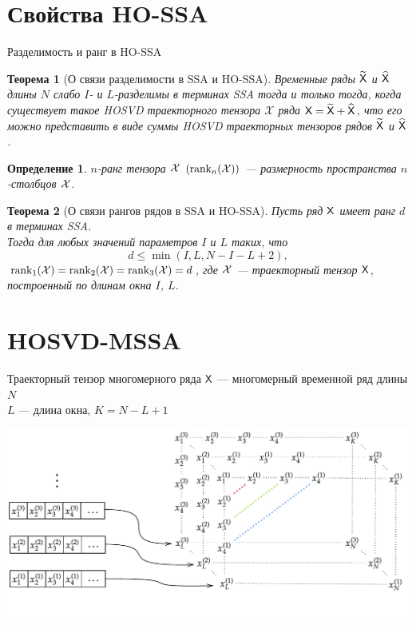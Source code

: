 \documentclass[pdf, unicode, 9pt, notheorems, handout]{beamer}
\newtheorem{theorem}{Теорема}
\newtheorem{definition}{Определение}
\begin{document}
    \section{Свойства HO-SSA}\label{sec:ho-ssa-properties}
    \begin{frame}{Разделимость и ранг в HO-SSA}
        \begin{theorem}[О связи разделимости в SSA и HO-SSA]
            Временные ряды $\widetilde{\mathsf{X}}$ и $\widehat{\mathsf{X}}$ длины $N$ слабо $I$- и
            $L$-разделимы в терминах \textup{SSA} тогда и только тогда, когда существует такое 
            \textup{HOSVD} траекторного тензора $\mathcal{X}$ ряда
            $\mathsf{X}=\widetilde{\mathsf{X}} + \widehat{\mathsf{X}}$, что его можно представить в виде суммы \textup{HOSVD}
            траекторных тензоров рядов $\widetilde{\mathsf{X}}$ и $\widehat{\mathsf{X}}$.
        \end{theorem}
        \begin{definition}
            $n$-ранг тензора $\mathcal{X}$ $\left(\operatorname{rank}_n(\mathcal{X})\right)$ --- размерность пространства $n$-столбцов $\mathcal{X}$.
        \end{definition}
        \begin{theorem}[О связи рангов рядов в SSA и HO-SSA]
            Пусть ряд $\mathsf{X}$ имеет ранг $d$ в терминах \textup{SSA}.\\
            Тогда для любых значений параметров $I$ и $L$ таких, что
            \[
            d \leqslant \min(I, L, N-I-L+2),
            \] 
            $\operatorname{rank}_1(\mathcal{X})=\operatorname{rank}_2(\mathcal{X})=\operatorname{rank}_3(\mathcal{X})=d$,
            где $\mathcal{X}$ --- траекторный тензор $\mathsf{X}$, построенный по длинам окна $I$, $L$.
        \end{theorem}
    \end{frame}
    
    
    \section{HOSVD-MSSA}\label{sec:hosvd-mssa}
    \begin{frame}{Траекторный тензор многомерного ряда}
        $\mathsf{X}$ --- многомерный временной ряд длины $N$\\{}
        $L$ --- длина окна, $K=N-L+1$ 
        
        \vspace{0.4cm}
        
        \centering
        \includegraphics[width=\textwidth]{./img/mssa_injection_new}
    \end{frame}
    
\end{document}
